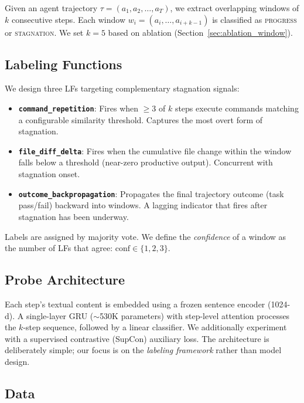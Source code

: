 \documentclass[11pt]{article}
\begin{document}
Given an agent trajectory $\tau = (a_1, a_2, \ldots, a_T)$, we extract overlapping windows of $k$ consecutive steps.
Each window $w_i = (a_i, \ldots, a_{i+k-1})$ is classified as \textsc{progress} or \textsc{stagnation}.
We set $k\!=\!5$ based on ablation (Section~\ref{sec:ablation_window}).

\subsection{Labeling Functions}
\label{sec:lfs}

We design three LFs targeting complementary stagnation signals:

\begin{itemize}
\item \textbf{\texttt{command\_repetition}}: Fires when $\geq$3 of $k$ steps execute commands matching a configurable similarity threshold. Captures the most overt form of stagnation.
\item \textbf{\texttt{file\_diff\_delta}}: Fires when the cumulative file change within the window falls below a threshold (near-zero productive output). Concurrent with stagnation onset.
\item \textbf{\texttt{outcome\_backpropagation}}: Propagates the final trajectory outcome (task pass/fail) backward into windows. A lagging indicator that fires after stagnation has been underway.
\end{itemize}

Labels are assigned by majority vote. We define the \emph{confidence} of a window as the number of LFs that agree: $\text{conf}\!\in\!\{1,2,3\}$.

\subsection{Probe Architecture}

Each step's textual content is embedded using a frozen sentence encoder (1024-d).
A single-layer GRU ($\sim$530K parameters) with step-level attention processes the $k$-step sequence, followed by a linear classifier.
We additionally experiment with a supervised contrastive (SupCon) auxiliary loss.
The architecture is deliberately simple; our focus is on the \emph{labeling framework} rather than model design.

\subsection{Data}
\end{document}

